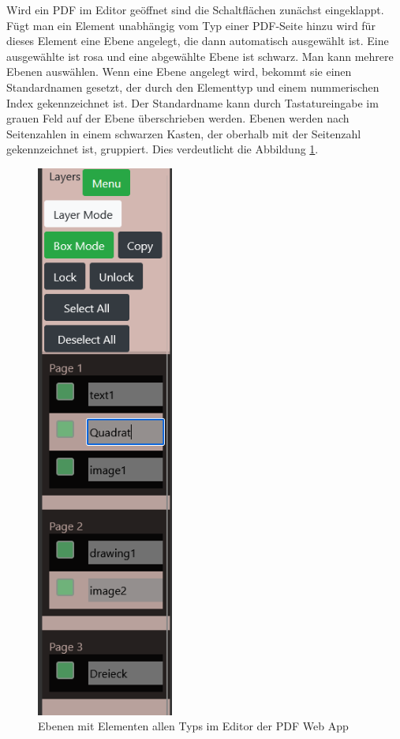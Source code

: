 Wird ein PDF im Editor geöffnet sind die Schaltflächen zunächst eingeklappt. Fügt man ein Element unabhängig vom Typ einer PDF-Seite hinzu wird für dieses Element eine Ebene angelegt, die dann automatisch ausgewählt ist. Eine ausgewählte ist rosa und eine abgewählte Ebene ist schwarz. Man kann mehrere Ebenen auswählen. Wenn eine Ebene angelegt wird, bekommt sie einen Standardnamen gesetzt, der durch den Elementtyp und einem nummerischen Index gekennzeichnet ist. Der Standardname kann durch Tastatureingabe im grauen Feld auf der Ebene überschrieben werden. Ebenen werden nach Seitenzahlen in einem schwarzen Kasten, der oberhalb mit der Seitenzahl gekennzeichnet ist, gruppiert. Dies verdeutlicht die Abbildung \ref{fig:ebenen}.   

\begin{figure}[!htbp]
	\centering
	\includegraphics[width=0.4\textwidth]{"images/ebenen.png"}
	\caption{Ebenen mit Elementen allen Typs im Editor der PDF Web App}
	\label{fig:ebenen}
\end{figure}

